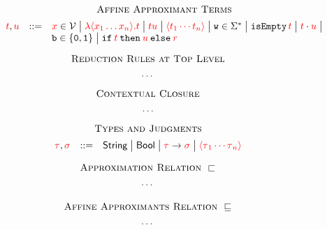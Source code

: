 \documentclass{article}
\begin{document}
\begin{figure}
	\[
	\begin{array}{rcl}
	\multicolumn{3}{c}{\textsc{Affine Approximant Terms}}\\[5pt]
	\tm,\tmtwo&\grameq&\var\in\mathcal{V} \grampipe \la{\bag{\var_1\ldots\var_n}}\tm \grampipe \tm\tmtwo  \grampipe \bag{\tm_1\cdots\tm_n}\grampipe \wo\in\Sigma^*\grampipe \isempty\tm\grampipe\cons\tm\tmtwo\grampipe\\
	&&\bool\in\{\zero,\one\}\grampipe \ite\tm\tmtwo\tmthree\\[3pt]
	\end{array}
	\]
	\[
	\begin{array}{rcl}
	\multicolumn{3}{c}{\textsc{Reduction Rules at Top Level}}\\[5pt]
	\multicolumn{3}{c}{\cdots}\\
	\end{array}
	\]
	\[
	\begin{array}{c}
	\textsc{Contextual Closure}\\[5pt]
	\cdots%
	\end{array}
	\]
	\[
	\begin{array}{rcl}
	\multicolumn{3}{c}{\textsc{Types and Judgments}}\\[5pt]
	\ty,\tytwo&\grameq&\Str\grampipe\Bool\grampipe\ty\to\tytwo\grampipe \bag{\ty_1\cdots\ty_n}
	\end{array}
	\]
\end{figure}

\begin{figure}
	\[
	\begin{array}{rcl}
	\multicolumn{3}{c}{\textsc{Approximation Relation }\appr}\\[5pt]
	\multicolumn{3}{c}{\cdots}\\
	\end{array}
	\]
\end{figure}

\begin{figure}
	\[
	\begin{array}{rcl}
	\multicolumn{3}{c}{\textsc{Affine Approximants Relation }\appraff}\\[5pt]
	\multicolumn{3}{c}{\cdots}\\
	\end{array}
	\]
\end{figure}
\end{document}

